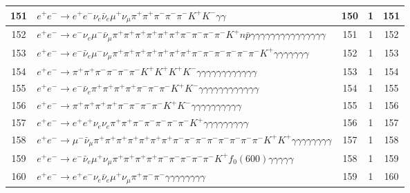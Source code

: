\documentclass[landscape]{article}
\begin{document}
\begin{table}[htbp!]
\begin{tabular}{|c|>{\centering}p{18cm}|c|c|c|}
\hline
151 & $ e^{+} e^{-} \rightarrow e^{+} e^{-} \nu_{e} \bar{\nu}_{e} \mu^{+} \nu_{\mu} \pi^{+} \pi^{+} \pi^{-} \pi^{-} \pi^{-} K^{+} K^{-} \gamma \gamma $ & 150 & 1 & 151 \\
\hline
152 & $ e^{+} e^{-} \rightarrow e^{-} \nu_{e} \mu^{-} \bar{\nu}_{\mu} \pi^{+} \pi^{+} \pi^{+} \pi^{+} \pi^{+} \pi^{+} \pi^{-} \pi^{-} \pi^{-} \pi^{-} K^{+} n \bar{p} \gamma \gamma \gamma \gamma \gamma \gamma \gamma \gamma \gamma \gamma \gamma \gamma \gamma \gamma \gamma $ & 151 & 1 & 152 \\
\hline
153 & $ e^{+} e^{-} \rightarrow e^{-} \bar{\nu}_{e} \mu^{-} \nu_{\mu} \pi^{+} \pi^{+} \pi^{+} \pi^{+} \pi^{+} \pi^{+} \pi^{+} \pi^{-} \pi^{-} \pi^{-} \pi^{-} \pi^{-} \pi^{-} K^{+} \gamma \gamma \gamma \gamma \gamma \gamma \gamma $ & 152 & 1 & 153 \\
\hline
154 & $ e^{+} e^{-} \rightarrow \pi^{+} \pi^{+} \pi^{-} \pi^{-} \pi^{-} \pi^{-} K^{+} K^{+} K^{+} K^{-} \gamma \gamma \gamma \gamma \gamma \gamma \gamma \gamma \gamma \gamma \gamma \gamma $ & 153 & 1 & 154 \\
\hline
155 & $ e^{+} e^{-} \rightarrow e^{-} \bar{\nu}_{e} \pi^{+} \pi^{+} \pi^{+} \pi^{+} \pi^{-} \pi^{-} \pi^{-} K^{+} K^{-} \gamma \gamma \gamma \gamma \gamma \gamma \gamma \gamma \gamma \gamma \gamma \gamma $ & 154 & 1 & 155 \\
\hline
156 & $ e^{+} e^{-} \rightarrow \pi^{+} \pi^{+} \pi^{+} \pi^{+} \pi^{-} \pi^{-} \pi^{-} \pi^{-} K^{+} K^{-} \gamma \gamma \gamma \gamma \gamma \gamma \gamma \gamma \gamma \gamma $ & 155 & 1 & 156 \\
\hline
157 & $ e^{+} e^{-} \rightarrow e^{+} e^{+} \nu_{e} \nu_{e} \pi^{+} \pi^{+} \pi^{-} \pi^{-} \pi^{-} \pi^{-} \pi^{-} K^{+} \gamma \gamma \gamma \gamma \gamma \gamma \gamma \gamma \gamma $ & 156 & 1 & 157 \\
\hline
158 & $ e^{+} e^{-} \rightarrow \mu^{-} \bar{\nu}_{\mu} \pi^{+} \pi^{+} \pi^{+} \pi^{+} \pi^{+} \pi^{+} \pi^{+} \pi^{-} \pi^{-} \pi^{-} \pi^{-} \pi^{-} \pi^{-} \pi^{-} \pi^{-} K^{+} K^{+} \gamma \gamma \gamma \gamma \gamma \gamma \gamma \gamma $ & 157 & 1 & 158 \\
\hline
159 & $ e^{+} e^{-} \rightarrow e^{-} \bar{\nu}_{e} \mu^{+} \nu_{\mu} \pi^{+} \pi^{+} \pi^{+} \pi^{+} \pi^{-} \pi^{-} \pi^{-} \pi^{-} \pi^{-} K^{+} f_{0}(600) \gamma \gamma \gamma \gamma \gamma $ & 158 & 1 & 159 \\
\hline
160 & $ e^{+} e^{-} \rightarrow e^{+} e^{-} \nu_{e} \bar{\nu}_{e} \mu^{+} \nu_{\mu} \pi^{+} \pi^{-} \pi^{-} \gamma \gamma \gamma \gamma \gamma \gamma \gamma \gamma $ & 159 & 1 & 160 \\
\hline
\end{tabular}
\end{table}
\end{document}
